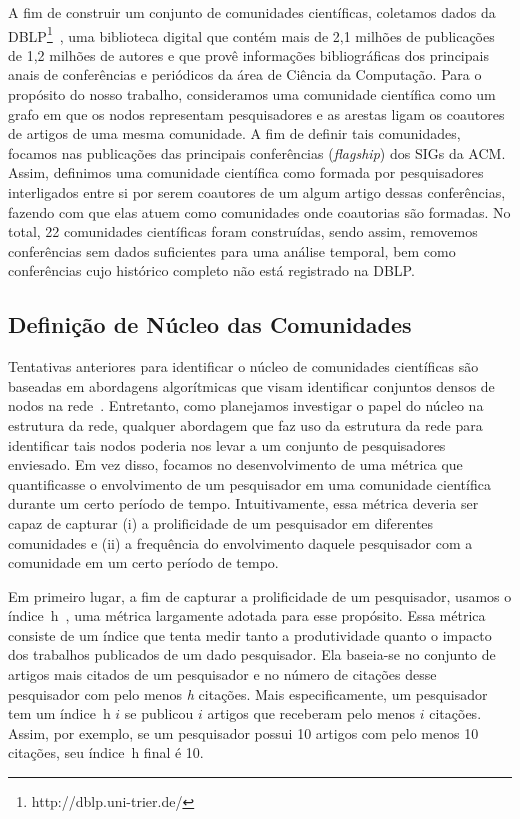 \documentclass[12pt]{article}
\begin{document}
A fim de construir um conjunto de comunidades científicas, coletamos dados da DBLP\footnote{http://dblp.uni-trier.de/}~\cite{Ley2009}, 
uma biblioteca digital que contém mais de 2,1 milhões de publicações de 1,2 milhões de autores e que provê informações 
bibliográficas dos principais anais de conferências e periódicos da área de Ciência da Computação. Para o propósito do nosso 
trabalho, consideramos uma comunidade científica como um grafo em que os nodos 
representam pesquisadores e as arestas ligam os coautores de artigos de uma mesma comunidade. A fim de definir tais 
comunidades, focamos nas publicações das principais conferências (\textit{flagship}) dos SIGs 
da ACM. Assim, definimos uma comunidade científica como formada por 
pesquisadores interligados entre si por serem coautores de um algum artigo dessas conferências, fazendo com 
que elas atuem como comunidades onde coautorias são formadas. No total, 22 comunidades científicas foram construídas,
sendo assim, removemos conferências sem dados suficientes para uma análise temporal, bem como conferências 
cujo histórico completo não está registrado na DBLP.

\subsection{Definição de Núcleo das Comunidades}

Tentativas anteriores para identificar o núcleo de comunidades científicas são baseadas em abordagens 
algorítmicas que visam identificar conjuntos densos de nodos na rede~\cite{Seifi2012}. Entretanto, 
como planejamos investigar o papel do núcleo na estrutura da rede, qualquer abordagem que faz uso da 
estrutura da rede para identificar tais nodos poderia nos levar a um conjunto de pesquisadores 
enviesado. Em vez disso, focamos no desenvolvimento de uma métrica que quantificasse o envolvimento 
de um pesquisador em uma comunidade científica durante um certo período de tempo. Intuitivamente, 
essa métrica deveria ser capaz de capturar (i) a prolificidade de um pesquisador em diferentes 
comunidades e (ii) a frequência do envolvimento daquele pesquisador com a comunidade em um certo 
período de tempo.

Em primeiro lugar, a fim de capturar a prolificidade de um pesquisador, usamos o índice~h~\cite{Hirsch2005}, 
uma métrica largamente adotada para esse propósito. Essa métrica consiste de um índice que tenta 
medir tanto a produtividade quanto o impacto dos trabalhos publicados de um dado pesquisador. Ela 
baseia-se no conjunto de artigos mais citados de um pesquisador e no número de citações 
desse pesquisador com pelo menos \textit{h} citações. Mais especificamente, um pesquisador tem 
um índice~h $i$ se publicou $i$ artigos que receberam pelo menos $i$ citações. Assim, por exemplo, se 
um pesquisador possui 10 artigos com pelo menos 10 citações, seu índice~h final é 10.
\end{document}

